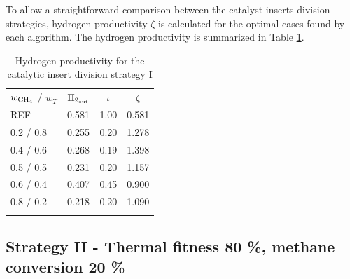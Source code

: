 \documentclass[preprint,12pt]{elsarticle}
\begin{document}


To allow a straightforward comparison between the catalyst inserts division strategies, hydrogen productivity $\zeta$ is calculated for the optimal cases found by each algorithm. The hydrogen productivity is summarized in Table \ref{tab:5RH2prod}. 

\begin{center}
\begin{table}
\centering
\caption{Hydrogen productivity for the catalytic insert division strategy I}
\label{tab:5RH2prod}
\begin{tabular}{l|c|c|c}
\hline\noalign{\smallskip}
 $w_{\rm{CH_4}}$ / $ w_T $ & $\rm{H_{2_{out}}}$ & $\iota$ & $\zeta$ \\
\noalign{\smallskip}\hline\noalign{\smallskip}
REF         & 0.581     & 1.00  &  0.581\\
0.2 / 0.8   & 0.255     & 0.20  & 1.278 \\
0.4 / 0.6   & 0.268     & 0.19  & 1.398 \\
0.5 / 0.5   & 0.231     & 0.20  & 1.157 \\
0.6 / 0.4   & 0.407     & 0.45  & 0.900 \\
0.8 / 0.2   & 0.218     & 0.20  & 1.090 \\
\noalign{\smallskip}\hline
\end{tabular}
\end{table}
\end{center}


\clearpage


\subsection{Strategy II - Thermal fitness 80 \%, methane conversion 20 \%} 
\label{subsec:S22080}
 

%
\end{document}
